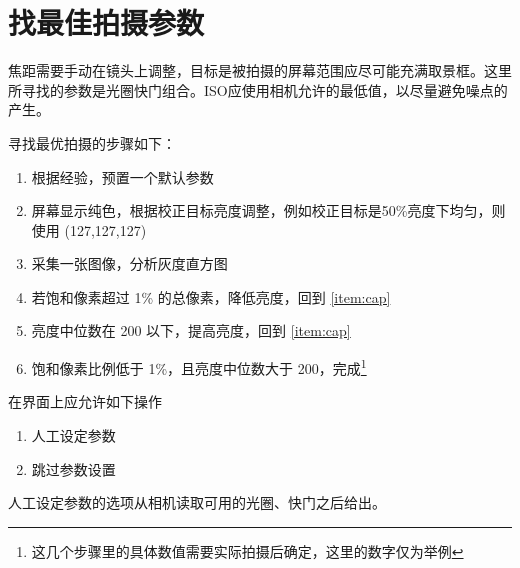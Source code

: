 
\section{找最佳拍摄参数} %
\label{sec:configure}

焦距需要手动在镜头上调整，目标是被拍摄的屏幕范围应尽可能充满取景框。这里所寻找的参数是光圈快门组合。ISO应使用相机允许的最低值，以尽量避免噪点的产生。

寻找最优拍摄的步骤如下：

\begin{enumerate}
	\item 根据经验，预置一个默认参数
	\item 屏幕显示纯色，根据校正目标亮度调整，例如校正目标是50\%亮度下均匀，则使用 (127,127,127)
	\item \label{item:cap} 采集一张图像，分析灰度直方图
	\item 若饱和像素超过 1\% 的总像素，降低亮度，回到 \ref{item:cap}
	\item 亮度中位数在 200 以下，提高亮度，回到 \ref{item:cap}
	\item 饱和像素比例低于 1\%，且亮度中位数大于 200，完成\footnote{这几个步骤里的具体数值需要实际拍摄后确定，这里的数字仅为举例}
\end{enumerate}

在界面上应允许如下操作

\begin{enumerate}
	\item 人工设定参数
	\item 跳过参数设置
\end{enumerate}

人工设定参数的选项从相机读取可用的光圈、快门之后给出。

